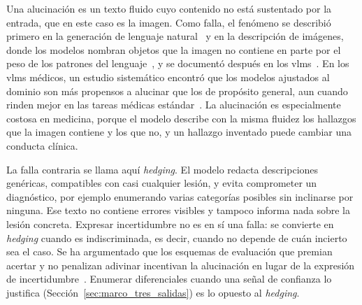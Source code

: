 Una alucinación es un texto fluido cuyo contenido no está sustentado por la entrada, que en este caso es la
imagen. Como falla, el fenómeno se describió primero en la generación de lenguaje
natural~\cite{ji2023survey} y en la descripción de imágenes, donde los modelos nombran objetos que la imagen no contiene en parte por el peso de
los patrones del lenguaje~\cite{rohrbach2018object}, y se documentó después en los
\glspl{vlm}~\cite{bai2024hallucination}. En los \glspl{vlm} médicos, un estudio sistemático encontró que los
modelos ajustados al dominio son más propensos a alucinar que los de propósito general, aun cuando rinden
mejor en las tareas médicas estándar~\cite{gu2024medvh}. La alucinación es especialmente costosa en medicina,
porque el modelo describe con la misma fluidez los hallazgos que la imagen contiene y los que no, y un
hallazgo inventado puede cambiar una conducta clínica.

La falla contraria se llama aquí \emph{hedging}. El modelo redacta descripciones genéricas, compatibles con
casi cualquier lesión, y evita comprometer un diagnóstico, por ejemplo enumerando varias categorías posibles
sin inclinarse por ninguna. Ese texto no contiene errores visibles y tampoco informa nada sobre la lesión
concreta. Expresar incertidumbre no es en sí una falla: se convierte en \emph{hedging} cuando es
indiscriminada, es decir, cuando no depende de cuán incierto sea el caso. Se ha argumentado que los esquemas
de evaluación que premian acertar y no penalizan adivinar incentivan la alucinación en lugar de la expresión
de incertidumbre~\cite{kalai2025hallucinate}. Enumerar diferenciales cuando una señal de confianza lo
justifica (Sección~\ref{sec:marco_tres_salidas}) es lo opuesto al \emph{hedging}.

